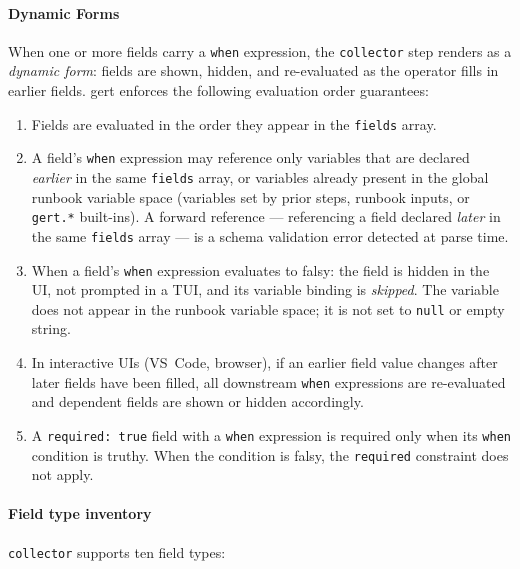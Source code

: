 \paragraph{Dynamic Forms}
\label{par:dynamic-forms}

When one or more fields carry a \texttt{when} expression, the \texttt{collector}
step renders as a \emph{dynamic form}: fields are shown, hidden, and re-evaluated
as the operator fills in earlier fields.  gert enforces the following evaluation
order guarantees:

\begin{enumerate}
  \item Fields are evaluated in the order they appear in the \texttt{fields}
        array.
  \item A field's \texttt{when} expression may reference only variables that
        are declared \emph{earlier} in the same \texttt{fields} array, or
        variables already present in the global runbook variable space
        (variables set by prior steps, runbook inputs, or \texttt{gert.*}
        built-ins).  A forward reference — referencing a field declared
        \emph{later} in the same \texttt{fields} array — is a schema
        validation error detected at parse time.
  \item When a field's \texttt{when} expression evaluates to falsy: the field
        is hidden in the UI, not prompted in a TUI, and its variable binding is
        \emph{skipped}.  The variable does not appear in the runbook variable
        space; it is not set to \texttt{null} or empty string.
  \item In interactive UIs (VS~Code, browser), if an earlier field value
        changes after later fields have been filled, all downstream
        \texttt{when} expressions are re-evaluated and dependent fields are
        shown or hidden accordingly.
  \item A \texttt{required: true} field with a \texttt{when} expression is
        required only when its \texttt{when} condition is truthy.  When the
        condition is falsy, the \texttt{required} constraint does not apply.
\end{enumerate}

\paragraph{Field type inventory}
\label{par:collector-field-types}

\texttt{collector} supports ten field types:

